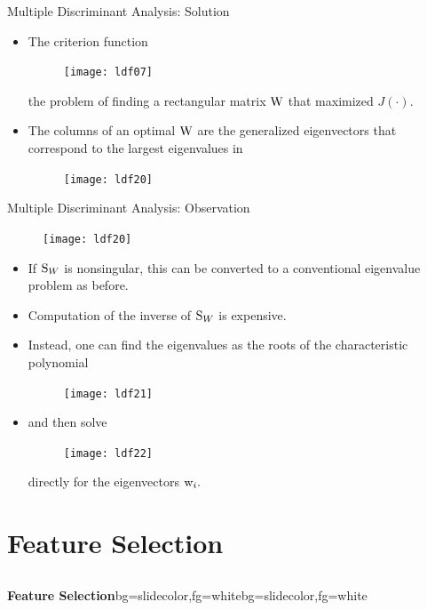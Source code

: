 \begin{frame}{Multiple Discriminant Analysis: Solution}
\begin{itemize}
\item The criterion function
\begin{figure}
\texttt{[image: ldf07]}
\end{figure}
the problem of finding a rectangular matrix ${\rm W}$ that maximized $J(\cdot)$. 
\item The columns of an optimal ${\rm W}$ are the generalized eigenvectors that correspond to the largest eigenvalues in
\begin{figure}
\texttt{[image: ldf20]}
\end{figure}
\end{itemize}
\end{frame}

\begin{frame}{Multiple Discriminant Analysis: Observation}

\begin{figure}
\texttt{[image: ldf20]}
\end{figure}
\begin{itemize}
\item If ${\rm S}_W$ is nonsingular, this can be converted to a conventional eigenvalue problem as before. 
\item Computation of the inverse of ${\rm S}_W$ is expensive.
\item Instead, one can find the eigenvalues as the roots of the characteristic polynomial
\begin{figure}
\texttt{[image: ldf21]}
\end{figure}
\item and then solve
\begin{figure}
\texttt{[image: ldf22]}
\end{figure}
directly for the eigenvectors ${\rm w}_i.$
\end{itemize}
\end{frame}


\section{Feature Selection}
\subsection{}
\begin{frame}{}
\begin{variableblock}{\centering \Large \textbf{\vspace{4pt}\newline Feature Selection\vspace{4pt}}}{bg=slidecolor,fg=white}{bg=slidecolor,fg=white}
\end{variableblock}
\end{frame}

